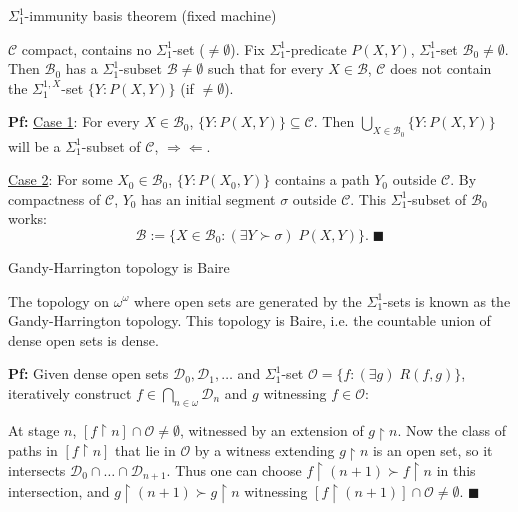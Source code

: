 \begin{frame}{$\Sigma_1^{1}$-immunity basis theorem (fixed machine)}
  \begin{lemma*}
    $\mathcal{C}$ compact, contains no $\Sigma_1^{1}$-set
    ($\neq\emptyset$). Fix $\Sigma_1^{1}$-predicate $P(X,Y)$,
    $\Sigma_1^{1}$-set $\mathcal{B}_0\neq\emptyset$. Then
    $\mathcal{B}_0$ has a $\Sigma_1^{1}$-subset
    $\mathcal{B}\neq\emptyset$ such that for every $X\in\mathcal{B}$,
    $\mathcal{C}$ does not contain the $\Sigma_1^{1,X}$-set
    $\{Y:P(X,Y)\}$ (if $\neq\emptyset$).
  \end{lemma*}

  \vspace{1em}
  \textbf{Pf:} \underline{Case 1}: For every $X\in\mathcal{B}_0$,
  $\{Y:P(X,Y)\}\subseteq\mathcal{C}$. Then $\bigcup_{X\in\mathcal{B}_0}
  \{Y:P(X,Y)\}$ will be a $\Sigma_1^{1}$-subset of $\mathcal{C}$,
  $\Rightarrow\Leftarrow$.

  \vspace{1em}
  \underline{Case 2}: For some $X_0\in\mathcal{B}_0$, $\{Y:P(X_0,Y)\}$
  contains a path $Y_0$ outside $\mathcal{C}$. By compactness of
  $\mathcal{C}$, $Y_0$ has an initial segment $\sigma$ outside
  $\mathcal{C}$. This $\Sigma_1^{1}$-subset of $\mathcal{B}_0$ works:
  \[\mathcal{B}:= \{X\in\mathcal{B}_0: (\exists Y\succ\sigma)\; P(X,Y)\}.\;
  \blacksquare\]
\end{frame}

\begin{frame}{Gandy-Harrington topology is Baire}
  \begin{thm*}
    The topology on $\omega^\omega$ where open sets are generated by the
    $\Sigma_1^{1}$-sets is known as the Gandy-Harrington topology. This
    topology is Baire, i.e. the countable union of dense open sets is
    dense.
  \end{thm*}

  \vspace{1em}
  \textbf{Pf:} Given dense open sets
  $\mathcal{D}_0,\mathcal{D}_1,\ldots$ and
  $\Sigma_1^1$-set $\mathcal{O}=\{f:(\exists g)\; R(f,g)\}$, iteratively
  construct $f\in\bigcap_{n\in\omega}\mathcal{D}_n$ and $g$ witnessing
  $f\in\mathcal{O}$:
  
  \vspace{1em}
  At stage $n$, $[f\restriction n]\cap\mathcal{O} \neq\emptyset$, witnessed
  by an extension of $g\restriction n$. Now the class of paths in
  $[f\restriction n]$ that lie in $\mathcal{O}$ by a witness extending
  $g\restriction n$ is an open set, so it intersects
  $\mathcal{D}_0\cap\ldots\cap\mathcal{D}_{n+1}$. Thus one can choose
  $f\restriction (n+1) \succ f\restriction n$ in this intersection, and
  $g\restriction (n+1) \succ g\restriction n$ witnessing $[f\restriction
  (n+1)]\cap\mathcal{O} \neq\emptyset$. $\blacksquare$
\end{frame}

